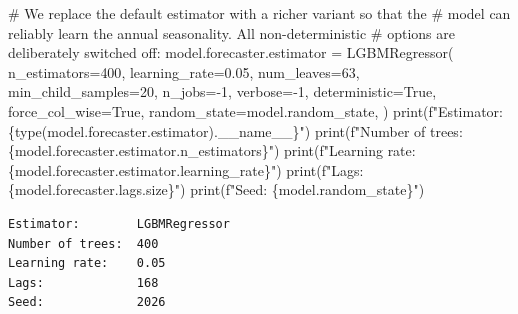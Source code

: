 \documentclass[
  english,
  letterpaper,
]{scrbook}
\newenvironment{Shaded}{\begin{snugshade}}{\end{snugshade}}
\newcommand{\BuiltInTok}[1]{\textcolor[rgb]{0.00,0.23,0.31}{#1}}
\newcommand{\CommentTok}[1]{\textcolor[rgb]{0.37,0.37,0.37}{#1}}
\newcommand{\DecValTok}[1]{\textcolor[rgb]{0.68,0.00,0.00}{#1}}
\newcommand{\FloatTok}[1]{\textcolor[rgb]{0.68,0.00,0.00}{#1}}
\newcommand{\NormalTok}[1]{\textcolor[rgb]{0.00,0.23,0.31}{#1}}
\newcommand{\OperatorTok}[1]{\textcolor[rgb]{0.37,0.37,0.37}{#1}}
\newcommand{\SpecialCharTok}[1]{\textcolor[rgb]{0.37,0.37,0.37}{#1}}
\newcommand{\SpecialStringTok}[1]{\textcolor[rgb]{0.13,0.47,0.30}{#1}}
\newcommand{\VariableTok}[1]{\textcolor[rgb]{0.07,0.07,0.07}{#1}}
\begin{document}
\begin{Shaded}
\begin{Highlighting}[]
\CommentTok{\# We replace the default estimator with a richer variant so that the}
\CommentTok{\# model can reliably learn the annual seasonality. All non{-}deterministic}
\CommentTok{\# options are deliberately switched off:}
\NormalTok{model.forecaster.estimator }\OperatorTok{=}\NormalTok{ LGBMRegressor(}
\NormalTok{    n\_estimators}\OperatorTok{=}\DecValTok{400}\NormalTok{,}
\NormalTok{    learning\_rate}\OperatorTok{=}\FloatTok{0.05}\NormalTok{,}
\NormalTok{    num\_leaves}\OperatorTok{=}\DecValTok{63}\NormalTok{,}
\NormalTok{    min\_child\_samples}\OperatorTok{=}\DecValTok{20}\NormalTok{,}
\NormalTok{    n\_jobs}\OperatorTok{={-}}\DecValTok{1}\NormalTok{,}
\NormalTok{    verbose}\OperatorTok{={-}}\DecValTok{1}\NormalTok{,}
\NormalTok{    deterministic}\OperatorTok{=}\VariableTok{True}\NormalTok{,}
\NormalTok{    force\_col\_wise}\OperatorTok{=}\VariableTok{True}\NormalTok{,}
\NormalTok{    random\_state}\OperatorTok{=}\NormalTok{model.random\_state,}
\NormalTok{)}
\BuiltInTok{print}\NormalTok{(}\SpecialStringTok{f"Estimator:        }\SpecialCharTok{\{}\BuiltInTok{type}\NormalTok{(model.forecaster.estimator)}\SpecialCharTok{.}\VariableTok{\_\_name\_\_}\SpecialCharTok{\}}\SpecialStringTok{"}\NormalTok{)}
\BuiltInTok{print}\NormalTok{(}\SpecialStringTok{f"Number of trees:  }\SpecialCharTok{\{}\NormalTok{model}\SpecialCharTok{.}\NormalTok{forecaster}\SpecialCharTok{.}\NormalTok{estimator}\SpecialCharTok{.}\NormalTok{n\_estimators}\SpecialCharTok{\}}\SpecialStringTok{"}\NormalTok{)}
\BuiltInTok{print}\NormalTok{(}\SpecialStringTok{f"Learning rate:    }\SpecialCharTok{\{}\NormalTok{model}\SpecialCharTok{.}\NormalTok{forecaster}\SpecialCharTok{.}\NormalTok{estimator}\SpecialCharTok{.}\NormalTok{learning\_rate}\SpecialCharTok{\}}\SpecialStringTok{"}\NormalTok{)}
\BuiltInTok{print}\NormalTok{(}\SpecialStringTok{f"Lags:             }\SpecialCharTok{\{}\NormalTok{model}\SpecialCharTok{.}\NormalTok{forecaster}\SpecialCharTok{.}\NormalTok{lags}\SpecialCharTok{.}\NormalTok{size}\SpecialCharTok{\}}\SpecialStringTok{"}\NormalTok{)}
\BuiltInTok{print}\NormalTok{(}\SpecialStringTok{f"Seed:             }\SpecialCharTok{\{}\NormalTok{model}\SpecialCharTok{.}\NormalTok{random\_state}\SpecialCharTok{\}}\SpecialStringTok{"}\NormalTok{)}
\end{Highlighting}
\end{Shaded}

\begin{verbatim}
Estimator:        LGBMRegressor
Number of trees:  400
Learning rate:    0.05
Lags:             168
Seed:             2026
\end{verbatim}
\end{document}
